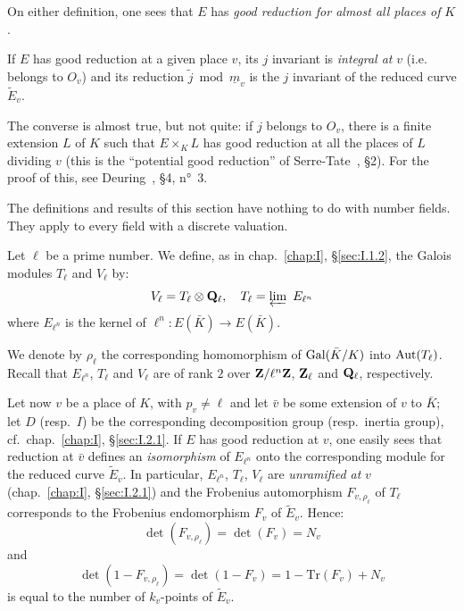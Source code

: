 On either definition, one sees that $E$ has \emph{good reduction for
almost all places of} $K$.

If $E$ has good reduction at a given place $v$, its $j$ invariant is
\emph{integral at} $v$ (i.e. belongs to $O_v$) and its reduction
$\tilde{j} \bmod \underline{m}_v$ is the $j$ invariant of the reduced
curve $\widetilde{E}_v$.

The converse is almost true, but not quite: if $j$ belongs to $O_v$,
there is a finite extension $L$ of $K$ such that $E \times_K L$ has
good reduction at all the places of $L$ dividing $v$ (this is the
``potential good reduction'' of Serre-Tate~\cite{serre-tate-good},
\S2).  For the proof of this, see Deuring~\cite{serre-corps}, \S4,
n°~3.


The definitions and results of this section have nothing to do with
number fields.  They apply to every field with a discrete valuation.


Let $\ell$ be a prime number.  We define, as in chap.~\ref{chap:I},
\S\ref{sec:I.1.2}, the Galois modules $T_\ell$ and $V_\ell$ by:
\[
V_\ell = T_\ell \mathbin{\otimes} \mathbf{Q}_\ell, \quad T_\ell = \varprojlim\ E_{\ell^n}
\]
where $E_{\ell^n}$ is the kernel of
$\ell^n : E(\bar K) \longrightarrow E(\bar K)$.

We denote by $\rho_\ell$ the corresponding homomorphism of
$\mathrm{Gal}(\bar K/K)$ into $\mathrm{Aut}(T_\ell)$.  Recall that $E_{\ell^n}$,
$T_\ell$ and $V_\ell$ are of rank $2$ over $\mathbf{Z}/\ell^n\mathbf{Z}$, $\mathbf{Z}_\ell$ and
$\mathbf{Q}_\ell$, respectively.

Let now $v$ be a place of $K$, with $p_v \neq \ell$ and let $\bar v$ be
some extension of $v$ to $\bar K$; let $D$ (resp.\ $I$) be the
corresponding decomposition group (resp.\ inertia group),
cf.~chap.~\ref{chap:I}, \S\ref{sec:I.2.1}.  If $E$ has good reduction
at $v$, one easily sees that reduction at $\bar v$ defines an
\emph{isomorphism} of $E_{\ell^n}$ onto the corresponding module for
the reduced curve $\widetilde{E}_v$.  In particular, $E_{\ell^n}$,
$T_\ell$, $V_\ell$ are \emph{unramified at} $v$
(chap.~\ref{chap:I}, \S\ref{sec:I.2.1}) and the Frobenius automorphism
$F_{v,\rho_\ell}$ of $T_\ell$ corresponds to the Frobenius endomorphism
$F_v$ of $\widetilde{E}_v$.  Hence:
\[
\det(F_{v,\rho_\ell}) = \det(F_v) = N_v
\]
and
\[
\det(1-F_{v,\rho_\ell}) = \det(1-F_v) = 1 - \mathrm{Tr}(F_v) + N_v
\]
is equal to the number of $k_v$-points of $\widetilde{E}_v$.

